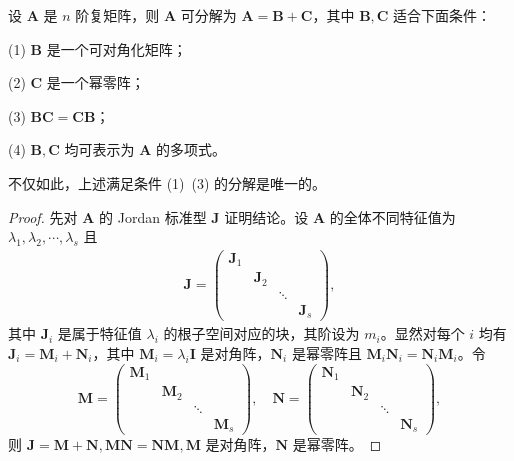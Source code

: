 \documentclass[../../main.tex]{subfiles}
\begin{document}
\begin{theorem}\label{theorem:Jordan-Chevalley分解}
设 $\boldsymbol{A}$ 是 $n$ 阶复矩阵，则 $\boldsymbol{A}$ 可分解为 $\boldsymbol{A} = \boldsymbol{B} + \boldsymbol{C}$，其中 $\boldsymbol{B}, \boldsymbol{C}$ 适合下面条件：

(1) $\boldsymbol{B}$ 是一个可对角化矩阵；

(2) $\boldsymbol{C}$ 是一个幂零阵；

(3) $\boldsymbol{BC} = \boldsymbol{CB}$；

(4) $\boldsymbol{B}, \boldsymbol{C}$ 均可表示为 $\boldsymbol{A}$ 的多项式。

不仅如此，上述满足条件 (1)~(3) 的分解是唯一的。
\end{theorem}
\begin{proof}
先对 $\boldsymbol{A}$ 的 Jordan 标准型 $\boldsymbol{J}$ 证明结论。设 $\boldsymbol{A}$ 的全体不同特征值为 $\lambda_1, \lambda_2, \cdots, \lambda_s$ 且
\begin{align*}
\boldsymbol{J} = 
\begin{pmatrix}
\boldsymbol{J}_1 & & & \\
 & \boldsymbol{J}_2 & & \\
 & & \ddots & \\
 & & & \boldsymbol{J}_s
\end{pmatrix},
\end{align*}
其中 $\boldsymbol{J}_i$ 是属于特征值 $\lambda_i$ 的根子空间对应的块，其阶设为 $m_i$。显然对每个 $i$ 均有 $\boldsymbol{J}_i = \boldsymbol{M}_i + \boldsymbol{N}_i$，其中 $\boldsymbol{M}_i = \lambda_i\boldsymbol{I}$ 是对角阵，$\boldsymbol{N}_i$ 是幂零阵且 $\boldsymbol{M}_i\boldsymbol{N}_i = \boldsymbol{N}_i\boldsymbol{M}_i$。令
\[
\boldsymbol{M} = 
\begin{pmatrix}
\boldsymbol{M}_1 & & & \\
 & \boldsymbol{M}_2 & & \\
 & & \ddots & \\
 & & & \boldsymbol{M}_s
\end{pmatrix}, \quad
\boldsymbol{N} = 
\begin{pmatrix}
\boldsymbol{N}_1 & & & \\
 & \boldsymbol{N}_2 & & \\
 & & \ddots & \\
 & & & \boldsymbol{N}_s
\end{pmatrix},
\]
则 $\boldsymbol{J} = \boldsymbol{M} + \boldsymbol{N}, \boldsymbol{MN} = \boldsymbol{NM}, \boldsymbol{M}$ 是对角阵，$\boldsymbol{N}$ 是幂零阵。


\end{proof}
\end{document}
